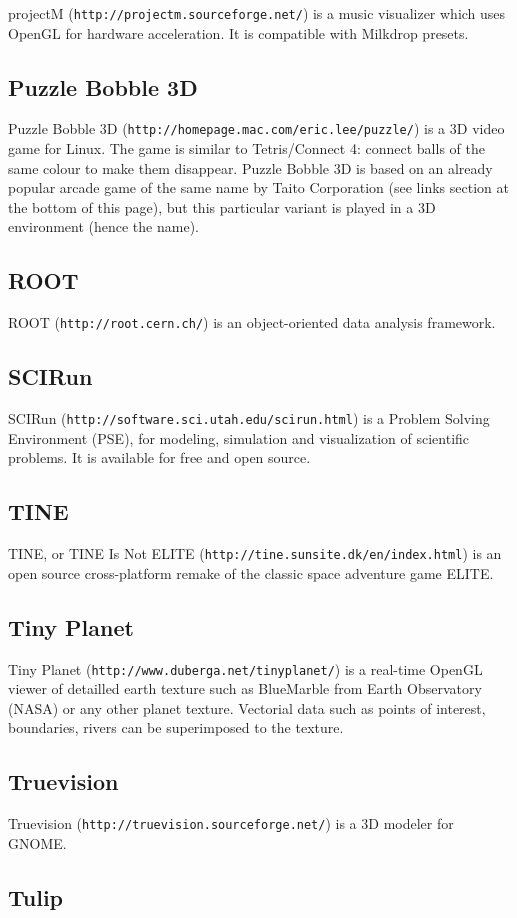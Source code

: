 projectM ({\tt http://projectm.sourceforge.net/}) is a music visualizer which uses OpenGL for hardware acceleration. It is compatible with Milkdrop presets.\subsection{Puzzle Bobble 3D}\label{ftgl-projects_puzzle}
Puzzle Bobble 3D ({\tt http://homepage.mac.com/eric.lee/puzzle/}) is a 3D video game for Linux. The game is similar to Tetris/Connect 4: connect balls of the same colour to make them disappear. Puzzle Bobble 3D is based on an already popular arcade game of the same name by Taito Corporation (see links section at the bottom of this page), but this particular variant is played in a 3D environment (hence the name).\subsection{ROOT}\label{ftgl-projects_root}
ROOT ({\tt http://root.cern.ch/}) is an object-\/oriented data analysis framework.\subsection{SCIRun}\label{ftgl-projects_scirun}
SCIRun ({\tt http://software.sci.utah.edu/scirun.html}) is a Problem Solving Environment (PSE), for modeling, simulation and visualization of scientific problems. It is available for free and open source.\subsection{TINE}\label{ftgl-projects_tine}
TINE, or TINE Is Not ELITE ({\tt http://tine.sunsite.dk/en/index.html}) is an open source cross-\/platform remake of the classic space adventure game ELITE.\subsection{Tiny Planet}\label{ftgl-projects_tinyplanet}
Tiny Planet ({\tt http://www.duberga.net/tinyplanet/}) is a real-\/time OpenGL viewer of detailled earth texture such as BlueMarble from Earth Observatory (NASA) or any other planet texture. Vectorial data such as points of interest, boundaries, rivers can be superimposed to the texture.\subsection{Truevision}\label{ftgl-projects_truevision}
Truevision ({\tt http://truevision.sourceforge.net/}) is a 3D modeler for GNOME.\subsection{Tulip}\label{ftgl-projects_tulip}

